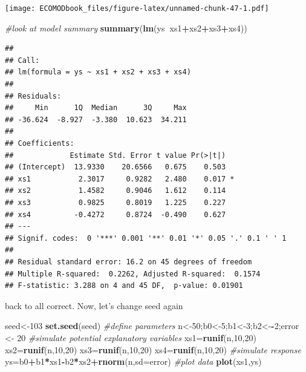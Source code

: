 \documentclass[
]{book}
\newenvironment{Shaded}{\begin{snugshade}}{\end{snugshade}}
\newcommand{\CommentTok}[1]{\textcolor[rgb]{0.56,0.35,0.01}{\textit{#1}}}
\newcommand{\DataTypeTok}[1]{\textcolor[rgb]{0.13,0.29,0.53}{#1}}
\newcommand{\DecValTok}[1]{\textcolor[rgb]{0.00,0.00,0.81}{#1}}
\newcommand{\KeywordTok}[1]{\textcolor[rgb]{0.13,0.29,0.53}{\textbf{#1}}}
\newcommand{\NormalTok}[1]{#1}
\newcommand{\OperatorTok}[1]{\textcolor[rgb]{0.81,0.36,0.00}{\textbf{#1}}}
\newcommand{\StringTok}[1]{\textcolor[rgb]{0.31,0.60,0.02}{#1}}
\begin{document}
\texttt{[image: ECOMODbook\_files/figure-latex/unnamed-chunk-47-1.pdf]}

\begin{Shaded}
\begin{Highlighting}[]
\CommentTok{#look at model summary}
\KeywordTok{summary}\NormalTok{(}\KeywordTok{lm}\NormalTok{(ys}\OperatorTok{~}\NormalTok{xs1}\OperatorTok{+}\NormalTok{xs2}\OperatorTok{+}\NormalTok{xs3}\OperatorTok{+}\NormalTok{xs4))}
\end{Highlighting}
\end{Shaded}

\begin{verbatim}
## 
## Call:
## lm(formula = ys ~ xs1 + xs2 + xs3 + xs4)
## 
## Residuals:
##     Min      1Q  Median      3Q     Max 
## -36.624  -8.927  -3.380  10.623  34.211 
## 
## Coefficients:
##             Estimate Std. Error t value Pr(>|t|)  
## (Intercept)  13.9330    20.6566   0.675    0.503  
## xs1           2.3017     0.9282   2.480    0.017 *
## xs2           1.4582     0.9046   1.612    0.114  
## xs3           0.9825     0.8019   1.225    0.227  
## xs4          -0.4272     0.8724  -0.490    0.627  
## ---
## Signif. codes:  0 '***' 0.001 '**' 0.01 '*' 0.05 '.' 0.1 ' ' 1
## 
## Residual standard error: 16.2 on 45 degrees of freedom
## Multiple R-squared:  0.2262,	Adjusted R-squared:  0.1574 
## F-statistic: 3.288 on 4 and 45 DF,  p-value: 0.01901
\end{verbatim}

back to all correct. Now, let's change seed again

\begin{Shaded}
\begin{Highlighting}[]
\NormalTok{seed<-}\DecValTok{103}
\KeywordTok{set.seed}\NormalTok{(seed)}
\CommentTok{#define parameters}
\NormalTok{n<-}\DecValTok{50}\NormalTok{;b0<-}\DecValTok{5}\NormalTok{;b1<-}\DecValTok{3}\NormalTok{;b2<-}\OperatorTok{-}\DecValTok{2}\NormalTok{;error <-}\StringTok{ }\DecValTok{20}
\CommentTok{#simulate potential explanatory variables}
\NormalTok{xs1=}\KeywordTok{runif}\NormalTok{(n,}\DecValTok{10}\NormalTok{,}\DecValTok{20}\NormalTok{)}
\NormalTok{xs2=}\KeywordTok{runif}\NormalTok{(n,}\DecValTok{10}\NormalTok{,}\DecValTok{20}\NormalTok{)}
\NormalTok{xs3=}\KeywordTok{runif}\NormalTok{(n,}\DecValTok{10}\NormalTok{,}\DecValTok{20}\NormalTok{)}
\NormalTok{xs4=}\KeywordTok{runif}\NormalTok{(n,}\DecValTok{10}\NormalTok{,}\DecValTok{20}\NormalTok{)}
\CommentTok{#simulate response}
\NormalTok{ys=b0}\OperatorTok{+}\NormalTok{b1}\OperatorTok{*}\NormalTok{xs1}\OperatorTok{-}\NormalTok{b2}\OperatorTok{*}\NormalTok{xs2}\OperatorTok{+}\KeywordTok{rnorm}\NormalTok{(n,}\DataTypeTok{sd=}\NormalTok{error)}
\CommentTok{#plot data}
\KeywordTok{plot}\NormalTok{(xs1,ys)}
\end{Highlighting}
\end{Shaded}
\end{document}
